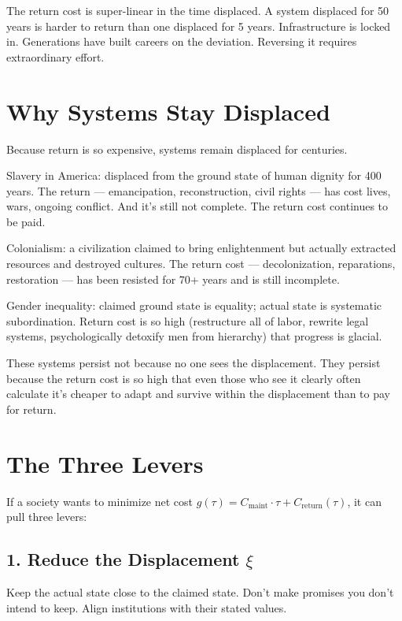 \documentclass[12pt]{article}
\begin{document}
The return cost is super-linear in the time displaced. A system displaced for 50 years is harder to return than one displaced for 5 years. Infrastructure is locked in. Generations have built careers on the deviation. Reversing it requires extraordinary effort.

\section{Why Systems Stay Displaced}

Because return is so expensive, systems remain displaced for centuries.

Slavery in America: displaced from the ground state of human dignity for 400 years. The return — emancipation, reconstruction, civil rights — has cost lives, wars, ongoing conflict. And it's still not complete. The return cost continues to be paid.

Colonialism: a civilization claimed to bring enlightenment but actually extracted resources and destroyed cultures. The return cost — decolonization, reparations, restoration — has been resisted for 70+ years and is still incomplete.

Gender inequality: claimed ground state is equality; actual state is systematic subordination. Return cost is so high (restructure all of labor, rewrite legal systems, psychologically detoxify men from hierarchy) that progress is glacial.

These systems persist not because no one sees the displacement. They persist because the return cost is so high that even those who see it clearly often calculate it's cheaper to adapt and survive within the displacement than to pay for return.

\section{The Three Levers}

If a society wants to minimize net cost $g(\tau) = C_{\text{maint}} \cdot \tau + C_{\text{return}}(\tau)$, it can pull three levers:

\subsection{1. Reduce the Displacement $\xi$}

Keep the actual state close to the claimed state. Don't make promises you don't intend to keep. Align institutions with their stated values.
\end{document}
